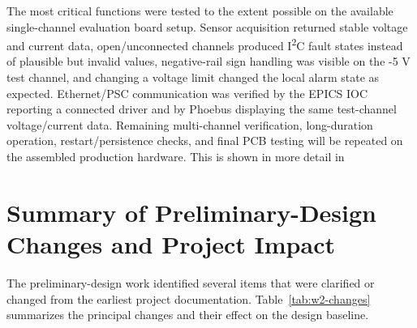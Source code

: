 The most critical functions were tested to the extent possible on the available
single-channel evaluation board setup. Sensor acquisition returned stable voltage
and current data, open\slash unconnected channels produced I\textsuperscript{2}C fault
states instead of plausible but invalid values, negative-rail sign handling was
visible on the -5 V test channel, and changing a voltage limit changed the local
alarm state as expected. Ethernet/PSC communication was verified by the EPICS
IOC reporting a connected driver and by Phoebus displaying the same test-channel
voltage/current data. Remaining multi-channel verification, long-duration
operation, restart/persistence checks, and final PCB testing will be repeated on
the assembled production hardware. This is shown in more detail in 


\section{Summary of Preliminary-Design Changes and Project Impact}
\label{sec:w2-design-changes}
The preliminary-design work identified several items that were clarified or
changed from the earliest project documentation. Table~\ref{tab:w2-changes}
summarizes the principal changes and their effect on the design baseline.

